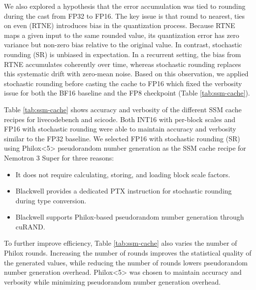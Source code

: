 We also explored a hypothesis that the error accumulation was tied to rounding during the cast from FP32 to FP16.
The key issue is that round to nearest, ties on even (RTNE) introduces bias in the quantization process. Because RTNE maps a given input to the same rounded value, its quantization error has zero variance but non-zero bias relative to the original value. In contrast, stochastic rounding (SR) is unbiased in expectation. In a recurrent setting, the bias from RTNE accumulates coherently over time, whereas stochastic rounding replaces this systematic drift with zero-mean noise. Based on this observation, we applied stochastic rounding before casting the cache to FP16 which fixed the verbosity issue for both the BF16 baseline and the FP8 checkpoint (Table \ref{tab:ssm-cache}).

Table \ref{tab:ssm-cache} shows accuracy and verbosity of the different SSM cache recipes for livecodebench and scicode. Both INT16 with per-block scales and FP16 with stochastic rounding were able to maintain accuracy and verbosity similar to the FP32 baseline.
We selected FP16 with stochastic rounding (SR) using Philox<5> pseudorandom number generation as the SSM cache recipe for Nemotron 3 Super for three reasons:
\begin{itemize}
    \item It does not require calculating, storing, and loading block scale factors.
    \item Blackwell provides a dedicated PTX instruction for stochastic rounding during type conversion.
    \item Blackwell supports Philox-based pseudorandom number generation through cuRAND. 
\end{itemize}
To further improve efficiency, Table \ref{tab:ssm-cache} also varies the number of Philox rounds. Increasing the number of rounds improves the statistical quality of the generated values, while reducing the number of rounds lowers pseudorandom number generation overhead. Philox<5> was chosen to maintain accuracy and verbosity while minimizing pseudorandom number generation overhead.

